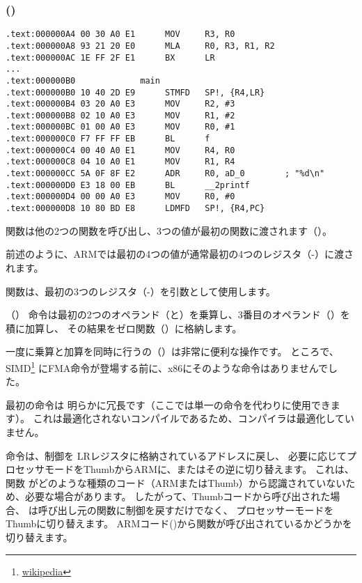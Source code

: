 \subsubsection{\NonOptimizingKeilVI (\ARMMode)}

\begin{lstlisting}[style=customasmARM]
.text:000000A4 00 30 A0 E1      MOV     R3, R0
.text:000000A8 93 21 20 E0      MLA     R0, R3, R1, R2
.text:000000AC 1E FF 2F E1      BX      LR
...
.text:000000B0             main
.text:000000B0 10 40 2D E9      STMFD   SP!, {R4,LR}
.text:000000B4 03 20 A0 E3      MOV     R2, #3
.text:000000B8 02 10 A0 E3      MOV     R1, #2
.text:000000BC 01 00 A0 E3      MOV     R0, #1
.text:000000C0 F7 FF FF EB      BL      f
.text:000000C4 00 40 A0 E1      MOV     R4, R0
.text:000000C8 04 10 A0 E1      MOV     R1, R4
.text:000000CC 5A 0F 8F E2      ADR     R0, aD_0        ; "%d\n"
.text:000000D0 E3 18 00 EB      BL      __2printf
.text:000000D4 00 00 A0 E3      MOV     R0, #0
.text:000000D8 10 80 BD E8      LDMFD   SP!, {R4,PC}
\end{lstlisting}

\main 関数は他の2つの関数を呼び出し、3つの値が最初の関数に渡されます（\ttf）。

前述のように、ARMでは最初の4つの値が通常最初の4つのレジスタ（-）に渡されます。

\ttf 関数は、最初の3つのレジスタ（-）を引数として使用します。

（）
命令は最初の2つのオペランド（と）を乗算し、3番目のオペランド（）を積に加算し、
その結果をゼロ関数（）に格納します。

一度に乗算と加算を同時に行うの（）は非常に便利な操作です。
ところで、SIMD\footnote{\href{http://go.yurichev.com/17103}{wikipedia}}
にFMA命令が登場する前に、x86にそのような命令はありませんでした。

最初の命令は
明らかに冗長です（ここでは単一の命令を代わりに使用できます）。
これは最適化されないコンパイルであるため、コンパイラは最適化していません。


命令は、制御を \ac{LR}レジスタに格納されているアドレスに戻し、
必要に応じてプロセッサモードをThumbからARMに、またはその逆に切り替えます。
これは、関数 \ttf がどのような種類のコード（ARMまたはThumb）から認識されていないため、必要な場合があります。
したがって、Thumbコードから呼び出された場合、
は呼び出し元の関数に制御を戻すだけでなく、
プロセッサーモードをThumbに切り替えます。 
ARMコード()から関数が呼び出されているかどうかを切り替えます。
